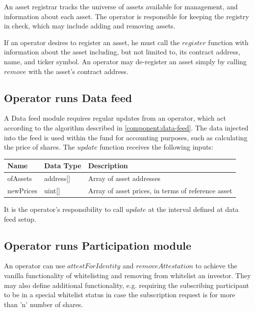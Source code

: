 \documentclass[conference]{IEEEtran}
\begin{document}
An asset registrar tracks the universe of assets available for management, and information about each asset.
The operator is responsible for keeping the registry in check, which may include adding and removing assets.

If an operator desires to register an asset, he must call the $register$ function with information about the asset including, but not limited to, its contract address, name, and ticker symbol.
An operator may de-register an asset simply by calling $remove$ with the asset's contract address.

\subsection{Operator runs Data feed}

A Data feed module requires regular updates from an operator, which act according to the algorithm described in \ref{component:data-feed}.
The data injected into the feed is used within the fund for accounting purposes, such as calculating the price of shares.
The $update$ function receives the following inputs:

\begin{center}
		\footnotesize
		\begin{tabular}{ | p{2.7cm} | p{0.8cm} | p{4cm} | }
		\hline
		Name & Data Type & Description \\ \hline
        ofAssets & address[] & Array of asset addresses \\ \hline
        newPrices & uint[] & Array of asset prices, in terms of reference asset \\ \hline
		\end{tabular}
\end{center}

It is the operator's responsibility to call $update$ at the interval defined at data feed setup.

\subsection{Operator runs Participation module}

An operator can use $attestForIdentity$ and $removeAttestation$ to achieve the vanilla functionality of whitelisting and removing from whitelist an investor. They may also define additional functionality, e.g. requiring the subscribing participant to be in a special whitelist status in case the subscription request is for more than 'n' number of shares.
\end{document}

